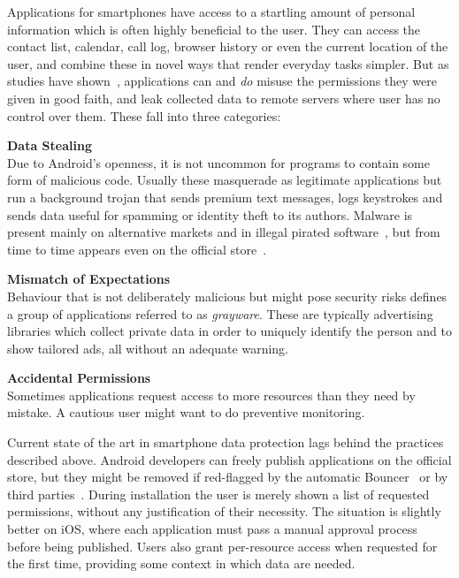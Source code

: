 \documentclass[12pt,twoside,notitlepage]{report}
\begin{document}
Applications for smartphones have access to a startling amount of personal information which is often highly beneficial to the user. They can access the contact list, calendar, call log, browser history or even the current location of the user, and combine these in novel ways that render everyday tasks simpler. But as studies have shown~\cite{web:Appthority, web:HuffingtonOneInThree}, applications can and \emph{do} misuse the permissions they were given in good faith, and leak collected data to remote servers where user has no control over them. These fall into three categories:
\begin{description}
\item \textbf{Data Stealing} \\
Due to Android's openness, it is not uncommon for programs to contain some form of malicious code. Usually these masquerade as legitimate applications but run a background trojan that sends premium text messages, logs keystrokes and sends data useful for spamming or identity theft to its authors. Malware is present mainly on alternative markets and in illegal pirated software~\cite{Zhou:2012:DRS:2133601.2133640}, but from time to time appears even on the official store~\cite{web:LookoutPlayRemoval}.

\item \textbf{Mismatch of Expectations} \\
Behaviour that is not deliberately malicious but might pose security risks defines a group of applications referred to as \emph{grayware}. These are typically advertising libraries which collect private data in order to uniquely identify the person and to show tailored ads, all without an adequate warning.

\item \textbf{Accidental Permissions} \\
Sometimes applications request access to more resources than they need by mistake. A cautious user might want to do preventive monitoring. 
\end{description}

Current state of the art in smartphone data protection lags behind the practices described above. Android developers can freely publish applications on the official store, but they might be removed if red-flagged by the automatic Bouncer~\cite{web:Bouncer} or by third parties~\cite{web:LookoutPlayRemoval}. During installation the user is merely shown a list of requested permissions, without any justification of their necessity. The situation is slightly better on iOS, where each application must pass a manual approval process before being published. Users also grant per-resource access when requested for the first time, providing some context in which data are needed.
\end{document}
